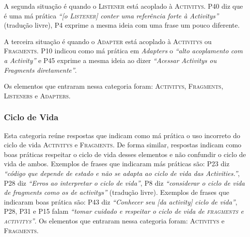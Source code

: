 A segunda situa\c{c}\~ao \'e quando o \textsc{Listener} est\'a acoplado \`a \textsc{Activitys}. P40 diz que \'e uma m\'a pr\'atica \textit{``[o \textsc{Listener}] conter uma refer\^encia forte \`a Activitys''} (tradu\c{c}\~ao livre), P4 exprime a mesma ideia com uma frase um pouco diferente. 

A terceira situa\c{c}\~ao \'e quando o \textsc{Adapter} est\'a acoplado \`a \textsc{Activitys} ou \textsc{Fragments}. P10 indicou como m\'a pr\'atica em \textit{Adapters} o \textit{``alto acoplamento com a Activity''} e P45 exprime a mesma ideia ao dizer \textit{``Acessar Activitys ou Fragments diretamente''}. 

Os elementos que entraram nessa categoria foram: \textsc{Activitys}, \textsc{Fragments}, \textsc{Listeners} e \textsc{Adapters}. 

\subsubsection{Ciclo de Vida}
Esta categoria re\'une respostas que indicam como m\'a pr\'atica o uso incorreto do ciclo de vida \textsc{Activitys} e \textsc{Fragments}. De forma similar, respostas indicam como boas pr\'aticas respeitar o ciclo de vida desses elementos e não confundir o ciclo de vida de ambos. Exemplos de frases que indicaram m\'as pr\'aticas s\~ao: P23 diz \textit{``código que depende de estado e não se adapta ao ciclo de vida das Activities.''}, P28 diz \textit{``Erros ao interpretar o ciclo de vida''}, P8 diz \textit{``considerar o ciclo de vida de fragments como os de activitys''} (tradução livre). Exemplos de frases que indicaram boas pr\'atica s\~ao: P43 diz \textit{``Conhecer seu [da activity] ciclo de vida''}, P28, P31 e P15 falam \textit{``tomar cuidado e respeitar o ciclo de vida de \textsc{fragments} e \textsc{activitys}''}. Os elementos que entraram nessa categoria foram: \textsc{Activitys} e \textsc{Fragments}. 



